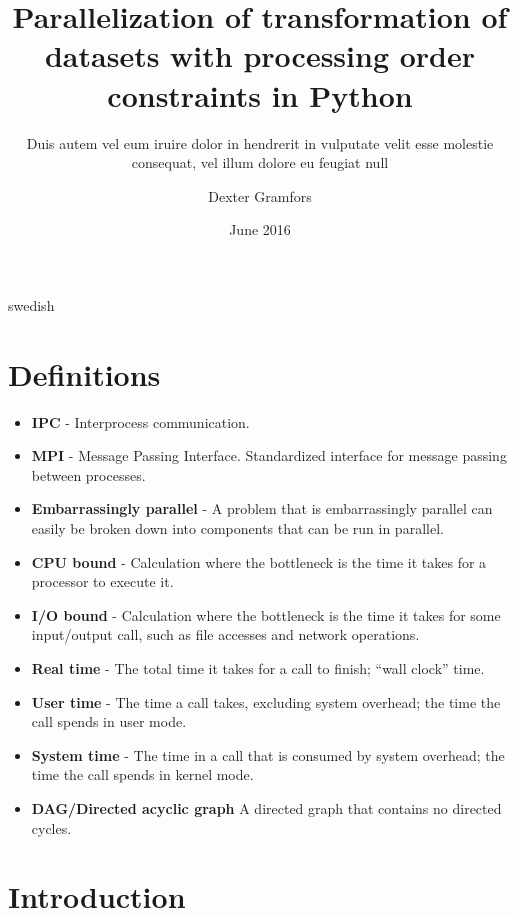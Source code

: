 \documentclass[a4paper,11pt,openany]{kth-mag}
\title{Parallelization of transformation of datasets with processing order constraints in Python}
\subtitle{Duis autem vel eum iruire dolor in hendrerit in
          vulputate velit esse molestie consequat, vel illum
          dolore eu feugiat null}
\author{Dexter Gramfors}
\date{June 2016}
\begin{document}
\frontmatter
\pagestyle{empty}
\removepagenumbers
\maketitle
{}
\begin{abstract}
    
\end{abstract}
\clearpage
\begin{foreignabstract}{swedish}
    
\end{foreignabstract}
\clearpage
\tableofcontents*
\clearpage
\listoffigures
\mainmatter
\chapter*{Definitions}
\begin{itemize}[label={}, leftmargin=*]
  \item \textbf{IPC} - Interprocess communication.
  \item \textbf{MPI} - Message Passing Interface. Standardized interface for message passing between processes.
  \item \textbf{Embarrassingly parallel} - A problem that is embarrassingly parallel can easily be broken down into components that
    can be run in parallel. %
  \item \textbf{CPU bound} - Calculation where the bottleneck is the time it takes for a processor to execute it.
  \item \textbf{I/O bound} - Calculation where the bottleneck is the time it takes for some input/output call, such as file accesses
    and network operations.
  \item \textbf{Real time} - The total time it takes for a call to finish; ``wall clock'' time.
  \item \textbf{User time} - The time a call takes, excluding system overhead; the time the call spends in user mode.
  \item \textbf{System time} - The time in a call that is consumed by system overhead; the time the call spends in kernel mode.
  \item \textbf{DAG/Directed acyclic graph} A directed graph that contains no directed cycles.
\end{itemize}

\pagestyle{newchap}
\chapter{Introduction}
    
\end{document}
